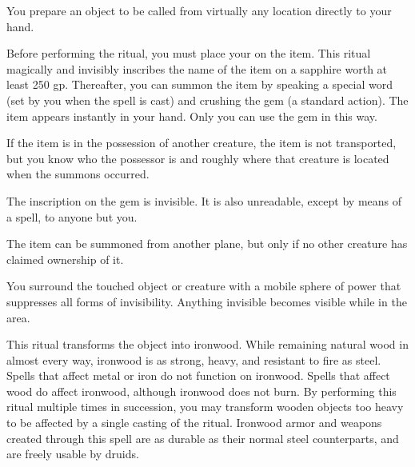 \spelleffect You prepare an object to be called from virtually any location directly to your hand.
\par Before performing the ritual, you must place your  on the item. This ritual magically and invisibly inscribes the name of the item on a sapphire worth at least 250 gp. Thereafter, you can summon the item by speaking a special word (set by you when the spell is cast) and crushing the gem (a standard action). The item appears instantly in your hand. Only you can use the gem in this way.
\par If the item is in the possession of another creature, the item is not transported, but you know who the possessor is and roughly where that creature is located when the summons occurred.
\par The inscription on the gem is invisible. It is also unreadable, except by means of a  spell, to anyone but you.
\par The item can be summoned from another plane, but only if no other creature has claimed ownership of it.

\spelldur{\durlong \dismissable}
\spelleffect You surround the touched object or creature with a mobile sphere of power that suppresses all forms of invisibility. Anything invisible becomes visible while in the area.

\spelleffect This ritual transforms the object into ironwood. While remaining natural wood in almost every way, ironwood is as strong, heavy, and resistant to fire as steel. Spells that affect metal or iron do not function on ironwood. Spells that affect wood do affect ironwood, although ironwood does not burn.
\spellnotes By performing this ritual multiple times in succession, you may transform wooden objects too heavy to be affected by a single casting of the ritual. Ironwood armor and weapons created through this spell are as durable as their normal steel counterparts, and are freely usable by druids.


